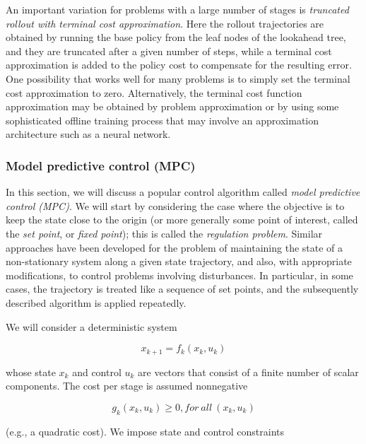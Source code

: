 \documentclass[
]{book}
\theoremstyle{definition}
\theoremstyle{definition}
\theoremstyle{definition}
\theoremstyle{definition}
\theoremstyle{remark}
\begin{document}
An important variation for problems with a large number of stages is \emph{truncated rollout with terminal cost approximation}. Here the rollout trajectories are obtained by running the base policy from the leaf nodes of the lookahead tree, and they are truncated after a given number of steps, while a terminal cost approximation is added to the policy cost to compensate for the resulting error. One possibility that works well for many problems is to simply set the terminal cost approximation to zero. Alternatively, the terminal cost function approximation may be obtained by problem approximation or by using some sophisticated offline training process that may involve an approximation architecture such as a neural network.

\hypertarget{model-predictive-control-mpc}{%
\subsubsection{Model predictive control (MPC)}\label{model-predictive-control-mpc}}

In this section, we will discuss a popular control algorithm called \emph{model predictive control (MPC)}. We will start by considering the case where the objective is to keep the state close to the origin (or more generally some point of interest, called the \emph{set point}, or \emph{fixed point}); this is called the \emph{regulation problem}. Similar approaches have been developed for the problem of maintaining the state of a non-stationary system along a given state trajectory, and also, with appropriate modifications, to control problems involving disturbances. In particular, in some cases, the trajectory is treated like a sequence of set points, and the subsequently described algorithm is applied repeatedly.

We will consider a deterministic system

\begin{equation}
x_{k+1} = f_k(x_k,u_k)
\end{equation}

whose state \(x_k\) and control \(u_k\) are vectors that consist of a finite number of scalar components. The cost per stage is assumed nonnegative

\begin{equation}
g_k(x_k,u_k) \geq 0, for \ all \ (x_k,u_k)
\end{equation}

(e.g., a quadratic cost). We impose state and control constraints
\end{document}
